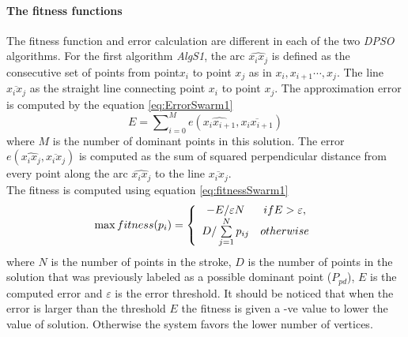 \documentclass[a4paper,10pt]{IEEEconf}
\begin{document}
\paragraph{The fitness functions}
The fitness function and error calculation are different in each of the two \textit{DPSO} algorithms. For the first algorithm \textsl{AlgS1}, 
 the arc $\widehat{x_ix_j}$ is defined as the consecutive set of points from point$x_i$ to point $x_{j}$ as in $x_i,x_{i+1} \cdots,x_j$. The line $\overline{x_i x_j} $ as the straight line connecting point $x_i$ to point $x_j$. The approximation error is computed by the equation \ref{eq:ErrorSwarm1}
\begin{equation}
E=\sum\nolimits_{i = 0}^M e ( \widehat{x_ix_{i+1}},\overline{x_i x_{i+1}})
\label{eq:ErrorSwarm1}
\end{equation} where $M$ is the number of dominant points in this solution. The error $e ( \widehat{x_ix_j},\overline{x_i x_j})$ is computed as the sum of squared perpendicular distance from every point along the arc $\widehat{x_ix_j}$ to the line $\overline{x_i x_j}$.  \\
The fitness is computed using equation \ref{eq:fitnessSwarm1}\begin{equation}
\max fitness(p_i ) = \left\{ {\begin{array}{*{20}c}
   { - E/\varepsilon N} & {ifE > \varepsilon ,}  \\
   {D/\sum\limits_{j = 1}^N {p_{ij} } } & {otherwise}  \\
\end{array}} \right.
\label{eq:fitnessSwarm1}
\end{equation} where $N$ is the number of points in the stroke, $D$ is the number of points in the solution that was previously labeled as a possible dominant point ($P_{pd}$), $E$ is the computed error and $\varepsilon$ is the error threshold. It should be noticed that when the error is larger than the threshold $E$ the fitness is given a -ve value to lower the value of solution. Otherwise the system favors the lower number of vertices.
\end{document}

